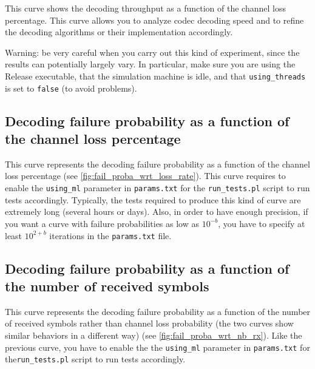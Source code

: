 \documentclass[a4paper,11pt]{article}
\begin{document}
{This curve shows the decoding throughput as a function of the channel loss percentage.
This curve allows you to analyze codec decoding speed and to refine the decoding algorithms
or their implementation accordingly.


Warning: be very careful when you carry out this kind of experiment, since the results can
potentially largely vary.
In particular, make sure you are using the Release executable, that the simulation machine
is idle, and that \verb+using_threads+ is set to \verb+false+ (to avoid problems).


\subsection{Decoding failure probability as a function of the channel loss percentage}

This curve represents the decoding failure probability as a function of the channel loss percentage
(see \ref{fig:fail_proba_wrt_loss_rate}).
This curve requires to enable the \verb+using_ml+ parameter in \verb+params.txt+ for the
\verb+run_tests.pl+ script to run tests accordingly.
Typically, the tests required to produce this kind of curve are extremely long (several
hours or days).
Also, in order to have enough precision, if you want a curve with failure probabilities
as low as $10^{-b}$, you have to specify at least $10^{2+b}$ iterations in the \verb+params.txt+
file.


\subsection{Decoding failure probability as a function of the number of received symbols}
This curve represents the decoding failure probability as a function of the number of received
symbols rather than channel loss probability (the two curves show similar behaviors in a different
way) (see \ref{fig:fail_proba_wrt_nb_rx}).
Like the previous curve, you have to enable the the \verb+using_ml+ parameter in \verb+params.txt+
for the\verb+run_tests.pl+ script to run tests accordingly.

}
\end{document}
